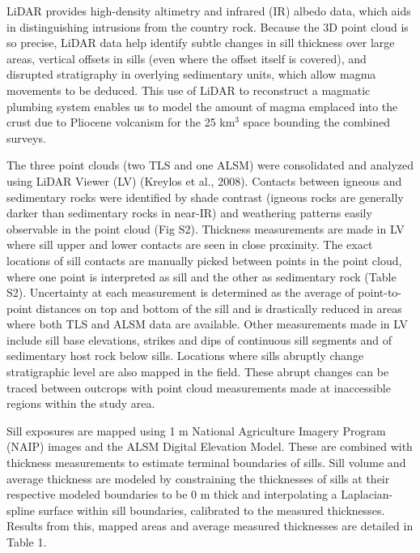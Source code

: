 \documentclass[12pt,letter]{article}
\begin{document}
LiDAR provides high-density altimetry and infrared (IR) albedo data, which aids in distinguishing intrusions from the country rock. Because the 3D point cloud is so precise, LiDAR data help identify subtle changes in sill thickness over large areas, vertical offsets in sills (even where the offset itself is covered), and disrupted stratigraphy in overlying sedimentary units, which allow magma movements to be deduced. This use of LiDAR to reconstruct a magmatic plumbing system enables us to model the amount of magma emplaced into the crust due to Pliocene volcanism for the 25 km$^3$ space bounding the combined surveys.

The three point clouds (two TLS and one ALSM) were consolidated and analyzed using LiDAR Viewer (LV) (Kreylos et al., 2008). Contacts between igneous and sedimentary rocks were identified by shade contrast (igneous rocks are generally darker than sedimentary rocks in near-IR) and weathering patterns easily observable in the point cloud (Fig S2). Thickness measurements are made in LV where sill upper and lower contacts are seen in close proximity. The exact locations of sill contacts are manually picked between points in the point cloud, where one point is interpreted as sill and the other as sedimentary rock (Table S2).  Uncertainty at each measurement is determined as the average of point-to-point distances on top and bottom of the sill and is drastically reduced in areas where both TLS and ALSM data are available. Other measurements made in LV include sill base elevations, strikes and dips of continuous sill segments and of sedimentary host rock below sills. Locations where sills abruptly change stratigraphic level are also mapped in the field. These abrupt changes can be traced between outcrops with point cloud measurements made at inaccessible regions within the study area.

Sill exposures are mapped using 1 m National Agriculture Imagery Program (NAIP) images and the ALSM Digital Elevation Model. These are combined with thickness measurements to estimate terminal boundaries of sills. Sill volume and average thickness are modeled by constraining the thicknesses of sills at their respective modeled boundaries to be 0 m thick and interpolating a Laplacian-spline surface within sill boundaries, calibrated to the measured thicknesses. Results from this, mapped areas and average measured thicknesses are detailed in Table 1.
\end{document}
